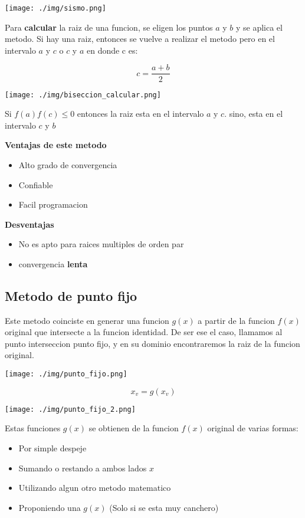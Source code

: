 \documentclass[10pt]{article}
\begin{document}
\texttt{[image: ./img/sismo.png]}

Para \textbf{calcular} la raiz de una funcion, se eligen los puntos
$a$ y $b$ y se aplica el metodo. Si hay una raiz, entonces se vuelve
a realizar el metodo pero en el intervalo $a$ y $c$ o $c$ y $a$ en 
donde c es:

\begin{equation}
	c = \dfrac{a+b}{2}
\end{equation}

\texttt{[image: ./img/biseccion\_calcular.png]}

Si $f(a)f(c) \leq 0$ entonces la raiz esta en el intervalo $a$ y 
$c$. sino, esta en el intervalo $c$ y $b$ 

\textbf{Ventajas de este metodo}

\begin{itemize}
	\item Alto grado de convergencia
	\item Confiable
	\item Facil programacion
\end{itemize}

\textbf{Desventajas}

\begin{itemize}
	\item No es apto para raices multiples de orden par
	\item convergencia \textbf{lenta}
\end{itemize}

\subsection{Metodo de punto fijo}

Este metodo coinciste en generar una funcion $g(x)$ a partir de la
funcion $f(x)$ original que intersecte a la funcion identidad.
De ser ese el caso, llamamos al punto interseccion punto fijo,
y en su dominio encontraremos la raiz de la funcion original.

\texttt{[image: ./img/punto\_fijo.png]}

\begin{equation}
	x_v = g(x_v)
\end{equation}

\texttt{[image: ./img/punto\_fijo\_2.png]}

Estas funciones $g(x)$ se obtienen de la funcion $f(x)$ original
de varias formas:

\begin{itemize}
	\item Por simple despeje
	\item Sumando o restando a ambos lados $x$ 
	\item Utilizando algun otro metodo matematico
	\item Proponiendo una $g(x)$ (Solo si se esta muy canchero)
\end{itemize}
\end{document}
